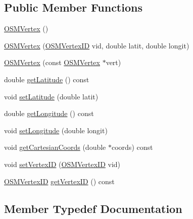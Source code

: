 \subsection*{Public Member Functions}
\begin{DoxyCompactItemize}
\item 
\mbox{\hyperlink{classbridges_1_1dataset_1_1_o_s_m_vertex_aa5d6ef7aef3bb762665aa6ab3a2658f6}{O\+S\+M\+Vertex}} ()
\item 
\mbox{\hyperlink{classbridges_1_1dataset_1_1_o_s_m_vertex_a9ad9739ae1da536fe5e66b2f07b8ba1d}{O\+S\+M\+Vertex}} (\mbox{\hyperlink{classbridges_1_1dataset_1_1_o_s_m_vertex_ad166f13b0aefbdc05a273546f2a3bb96}{O\+S\+M\+Vertex\+ID}} vid, double latit, double longit)
\item 
\mbox{\hyperlink{classbridges_1_1dataset_1_1_o_s_m_vertex_a0459f92f161c9e1d465c5142b947a704}{O\+S\+M\+Vertex}} (const \mbox{\hyperlink{classbridges_1_1dataset_1_1_o_s_m_vertex}{O\+S\+M\+Vertex}} $\ast$vert)
\item 
double \mbox{\hyperlink{classbridges_1_1dataset_1_1_o_s_m_vertex_a1f41a5f01d68747ee04b5c5eaa629c6e}{get\+Latitude}} () const
\item 
void \mbox{\hyperlink{classbridges_1_1dataset_1_1_o_s_m_vertex_af4ab2d69122919f504b78bd9540ccaa1}{set\+Latitude}} (double latit)
\item 
double \mbox{\hyperlink{classbridges_1_1dataset_1_1_o_s_m_vertex_a98e17875d886a63ed73a6f77cc26686d}{get\+Longitude}} () const
\item 
void \mbox{\hyperlink{classbridges_1_1dataset_1_1_o_s_m_vertex_a48e077133233ba705342ba955c6fdc23}{set\+Longitude}} (double longit)
\item 
void \mbox{\hyperlink{classbridges_1_1dataset_1_1_o_s_m_vertex_a0151ea438e8265b184a91c9591aa8a12}{get\+Cartesian\+Coords}} (double $\ast$coords) const
\item 
void \mbox{\hyperlink{classbridges_1_1dataset_1_1_o_s_m_vertex_ae16bbcdef938da97f2c665825ecac346}{set\+Vertex\+ID}} (\mbox{\hyperlink{classbridges_1_1dataset_1_1_o_s_m_vertex_ad166f13b0aefbdc05a273546f2a3bb96}{O\+S\+M\+Vertex\+ID}} vid)
\item 
\mbox{\hyperlink{classbridges_1_1dataset_1_1_o_s_m_vertex_ad166f13b0aefbdc05a273546f2a3bb96}{O\+S\+M\+Vertex\+ID}} \mbox{\hyperlink{classbridges_1_1dataset_1_1_o_s_m_vertex_a92f3b28a05940e4c45a0cf933c3fab2c}{get\+Vertex\+ID}} () const
\end{DoxyCompactItemize}


\subsection{Member Typedef Documentation}
\mbox{\label{classbridges_1_1dataset_1_1_o_s_m_vertex_ad166f13b0aefbdc05a273546f2a3bb96}} 
